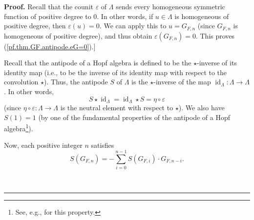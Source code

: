 \documentclass[numbers=enddot,12pt,final,onecolumn,notitlepage]{scrartcl}%
\theoremstyle{definition}
\newenvironment{proof}[1][Proof]{\noindent\textbf{#1.} }{\ \rule{0.5em}{0.5em}}
\let\sumnonlimits\sum
\renewcommand{\sum}{\sumnonlimits\limits}
\newenvironment{verlong}{}{}
\begin{document}
\begin{verlong}
\begin{proof}
Recall that the counit $\varepsilon$ of $\Lambda$ sends every homogeneous
symmetric function of positive degree to $0$. In other words, if $u\in\Lambda$
is homogeneous of positive degree, then $\varepsilon\left(  u\right)  =0$. We
can apply this to $u=G_{F,n}$ (since $G_{F,n}$ is homogeneous of positive
degree), and thus obtain $\varepsilon\left(  G_{F,n}\right)  =0$. This proves
(\ref{pf.thm.GF.antipode.eG=0}).]

Recall that the antipode of a Hopf algebra is defined to be the $\star
$-inverse of its identity map (i.e., to be the inverse of its identity map
with respect to the convolution $\star$). Thus, the antipode $S$ of $\Lambda$
is the $\star$-inverse of the map $\operatorname*{id}\nolimits_{\Lambda
}:\Lambda\rightarrow\Lambda$. In other words,%
\begin{equation}
S\star\operatorname*{id}\nolimits_{\Lambda}=\operatorname*{id}%
\nolimits_{\Lambda}\star S=\eta\circ\varepsilon\label{pf.thm.GF.antipode.Sid2}%
\end{equation}
(since $\eta\circ\varepsilon:\Lambda\rightarrow\Lambda$ is the neutral element
with respect to $\star$). We also have $S\left(  1\right)  =1$ (by one of the
fundamental properties of the antipode of a Hopf algebra\footnote{See, e.g.,
\cite[Proposition 1.4.10]{GriRei} for this property.}).

Now, each positive integer $n$ satisfies%
\begin{equation}
S\left(  G_{F,n}\right)  =-\sum_{i=0}^{n-1}S\left(  G_{F,i}\right)  \cdot
G_{F,n-i}. \label{pf.thm.GF.antipode.SG1}%
\end{equation}



\end{proof}
\end{verlong}
\end{document}
